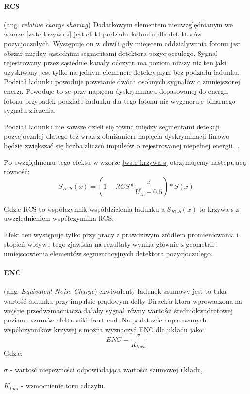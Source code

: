 \paragraph{RCS}
(ang. \textit{relative charge sharing})
Dodatkowym elementem nieuwzględnianym we wzorze \ref{wste krzywa s} jest efekt podziału ładunku dla detektorów pozycjoczułych. Występuje on w chwili gdy miejscem oddziaływania fotonu jest obszar między sąsiednimi segmentami detektora pozycjoczułego. Sygnał rejestrowany przez sąsiednie kanały odczytu ma poziom niższy niż ten jaki uzyskiwany jest tylko na jednym elemencie detekcyjnym bez podziału ładunku.
Podział ładunku powoduje powstanie dwóch osobnych sygnałów o zmniejszonej energi. Powoduje to że przy napięciu dyskryminacji dopasowanej do energii fotonu przypadek podziału ładunku dla tego fotonu nie wygeneruje binarnego sygnału zliczenia. 

Podział ładunku nie zawsze dzieli się równo między segmentami detekcji pozycjoczułej dlatego też wraz z obniżaniem napięcia dyskryminacji liniowo będzie zwiększać się liczba zliczeń impulsów o rejestrowanej niepełnej energii.~\cite{Monika mag}. 

Po uwzględnieniu tego efektu w wzorze \ref{wste krzywa s} otrzymujemy następującą równość:
\begin{equation}
        \label{wstep rcs}
        S_{RCS}(x) = (1-RCS * \frac{x}{\overline{U_{th}} - 0.5}) * S(x)
\end{equation}

Gdzie RCS to współczynnik współdzielenia ładunku a $S_{RCS}(x)$ to krzywa s z uwzględnieniem współczynnika RCS.

Efekt ten występuje tylko przy pracy z prawdziwym źródłem promieniowania i stopień wpływu tego zjawiska na rezultaty wynika głównie z geometrii i umiejscowienia elementów segmentacyjnych detektora pozycjoczułego.

\paragraph{ENC}
 (ang. \textit{Equivalent Noise Charge}) ekwiwalenty ładunek szumowy jest to taka wartość ładunku przy impulsie prądowym delty Dirack'a która wprowadzona na wejście przedwzmacniacza dałaby sygnał równy wartości średniokwadratowej poziomu szumów elektroniki front-end. Na podstawie dopasowanych współczynników krzywej s można wyznaczyć ENC dla układu jako: 
 \begin{equation}
        \label{enc}
         ENC = \frac{\sigma}{K_{toru}}
 \end{equation}
 Gdzie:
 \begin{description}
        \item  $\sigma$ - wartość niepewności odpowiadająca wartości szumowej układu, 
        \item $K_{toru}$ - wzmocnienie toru odczytu.
 \end{description}
 
